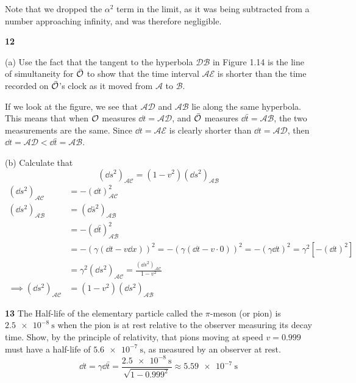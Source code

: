 \documentclass[gr-notes.tex]{subfiles}
\begin{document}
Note that we dropped the $\alpha^2$ term in the limit, as it was being subtracted from a number approaching infinity, and was therefore negligible.


\textbf{12}

(a) Use the fact that the tangent to the hyperbola $\mathcal{DB}$ in Figure 1.14 is the line of simultaneity for $\bar{\mathcal{O}}$ to show that the time interval $\mathcal{AE}$ is shorter than the time recorded on $\bar{\mathcal{O}}$'s clock as it moved from $\mathcal{A}$ to $\mathcal{B}$.

If we look at the figure, we see that $\mathcal{AD}$ and $\mathcal{AB}$ lie along the same hyperbola. This means that when $\mathcal{O}$ measures $\dd{t} = \mathcal{AD}$, and $\bar{\mathcal{O}}$ measures $\dd{\bar{t}} = \mathcal{AB}$, the two measurements are the same. Since $\dd{t} = \mathcal{AE}$ is clearly shorter than $\dd{t} = \mathcal{AD}$, then $\dd{t} = \mathcal{AD} < \dd{\bar{t}} = \mathcal{AB}$.


(b) Calculate that
%
\begin{displaymath}
  (\dd{s}^2)_{\mathcal{AC}} =
  (1 - v^2) (\dd{s}^2)_{\mathcal{AB}}
\end{displaymath}
%
\begin{align*}
  (\dd{s}^2)_{\mathcal{AC}} &=
  -(\dd{t})_{\mathcal{AC}}^2
  \\
  (\dd{s}^2)_{\mathcal{AB}} &=
  (\dd{\bar{s}}^2)_{\mathcal{AB}}
  \\ &=
  -(\dd{\bar{t}})_{\mathcal{AB}}^2
  \\ &=
  -(\gamma (\dd{t} - v \dd{x}))^2 =
  -(\gamma (\dd{t} - v \cdot 0))^2 =
  -(\gamma \dd{t})^2 =
  \gamma^2 [-(\dd{t})^2]
  \\ &=
  \gamma^2 (\dd{s}^2)_{\mathcal{AC}} =
  \frac{(\dd{s}^2)_{\mathcal{AC}}}{1 - v^2}
  \\ \implies
  (\dd{s}^2)_{\mathcal{AC}} &=
  (1 - v^2) (\dd{s}^2)_{\mathcal{AB}}
\end{align*}


\textbf{13}
The Half-life of the elementary particle called the $\pi$-meson (or pion) is $\SI{2.5e-8}{\second}$ when the pion is at rest relative to the observer measuring its decay time. Show, by the principle of relativity, that pions moving at speed $v = 0.999$ must have a half-life of $\SI{5.6e-7}{\second}$, as measured by an observer at rest.
%
\begin{displaymath}
  \dd{t} =
  \gamma \dd{\bar{t}} =
  \frac{\SI{2.5e-8}{\second}}{\sqrt{1 - 0.999^2}} \approx
  \SI{5.59e-7}{\second}
\end{displaymath}
\end{document}
